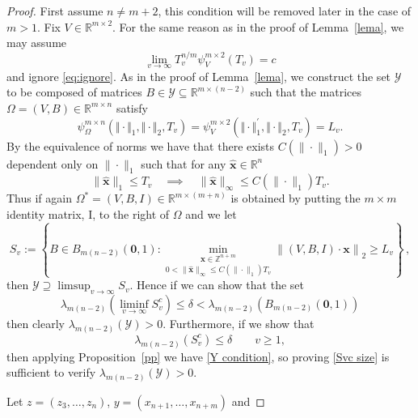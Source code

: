 \documentclass[10pt]{amsart}
\theoremstyle{definition}
\newcommand{\R}{\mathbb{R}}
\newcommand{\Z}{\mathbb{Z}}
\newcommand{\xx}{\boldsymbol{x} }
\begin{document}
\begin{proof}
   First assume $n\ne m+2$, this condition will be removed later in the case of $m>1$. 
    Fix $V \in \R^{m\times 2}$. 
    For the same reason as in the proof of Lemma~\ref{lema}, we may assume
    \[
    \lim_{v\to\infty} T_v^{n/m}\psi_{V}^{m\times 2}(T_v)=c
    \]
    and ignore \eqref{eq:ignore}.
    As in the proof of Lemma~\ref{lema}, we construct the set $\mathcal{Y}$ to be composed of matrices $B\in \mathcal{Y}\subseteq \R^{m\times(n-2)}$ such that the matrices $\Omega=(V,B)\in \R^{m\times n}$ satisfy
    \[
	\psi_{\Omega}^{m\times n}(\Vert\cdot\Vert_1, \Vert\cdot\Vert_2,T_{v})=\psi_{V}^{m\times 2}(\Vert\cdot\Vert_1^{\prime}, \Vert\cdot\Vert_2, T_{v})= L_v.
	\] 
 By the equivalence of norms we have that there exists $C(\|\cdot\|_{1})>0$ dependent only on $\|\cdot\|_{1}$ such that for any $\hat{\xx}\in\R^{n}$
 \begin{equation*}
     \|\hat{\xx}\|_{1}\leq T_{v} \quad \implies \quad \|\hat{\xx}\|_{\infty} \leq C(\|\cdot\|_{1})T_{v}.
 \end{equation*}
 Thus if again $\Omega^{\ast}=(V,B,I)\in \R^{m\times (m+n)}$ is obtained by putting the $m\times m$ identity matrix, I, to the right of $\Omega$ and we let
 \begin{equation*}
     S_{v}:=\left\{ B \in B_{m(n-2)}(\boldsymbol{0},1): \underset{0<\|\hat{\xx}\|_{\infty}\leq C(\|\cdot\|_{1})T_{v}}{\min_{\xx \in \Z^{n+m}}} \left\|(V,B,I)\cdot \xx \right\|_{2} \geq L_{v} \right\}\, ,  
 \end{equation*}
then $\mathcal{Y} \supseteq \limsup_{v\to \infty} S_{v}$. Hence if we can show that the set 
 \begin{equation} \label{Y condition}
    \lambda_{m(n-2)}\left( \liminf_{v\to \infty} S_{v}^{c} \right) \leq \delta < \lambda_{m(n-2)}\left(B_{m(n-2)}(\boldsymbol{0},1)\right)
 \end{equation}
 then clearly $\lambda_{m(n-2)}(\mathcal{Y})>0$. Furthermore, if we show that
 \begin{equation} \label{Svc size}
     \lambda_{m(n-2)}(S_{v}^{c})\leq \delta \qquad v\geq 1,
 \end{equation}
 then applying Proposition~\ref{pp} we have \eqref{Y condition}, so proving \eqref{Svc size} is sufficient to verify $\lambda_{m(n-2)}(\mathcal{Y})>0$. \par 
 Let $z=(z_{3},\dots,z_{n})$, $y=(x_{n+1},\dots, x_{n+m})$ and

\end{proof}
\end{document}
